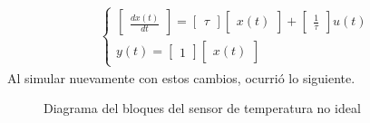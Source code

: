 \documentclass[a4paper, 10pt, onecolumn,journal]{ieeeconf}
\begin{document}
\begin{align}
	\begin{cases}
		\begin{bmatrix}
			\frac{d x(t)}{dt} 
		\end{bmatrix} = 
		\begin{bmatrix}
			\tau
		\end{bmatrix}
		\begin{bmatrix}
			x(t) 
		\end{bmatrix} + 
		\begin{bmatrix}
			\frac{1}{\tau}
		\end{bmatrix} u(t) \\
		y(t) = \begin{bmatrix}
			1 
		\end{bmatrix} 
		\begin{bmatrix}
			x(t)
		\end{bmatrix}
	\end{cases}\label{ecuacion matricial de sensor de temperatura}
\end{align}
Al simular nuevamente con estos cambios, ocurrió lo siguiente.
\begin{figure}[H]
	\centering
	\begin{adjustbox}{max width=\columnwidth}
	\end{adjustbox}
	\caption{Diagrama del bloques del sensor de temperatura no ideal}
	\label{Diagrama del bloques del sensor de temperatura no ideal}
\end{figure}
\end{document}
